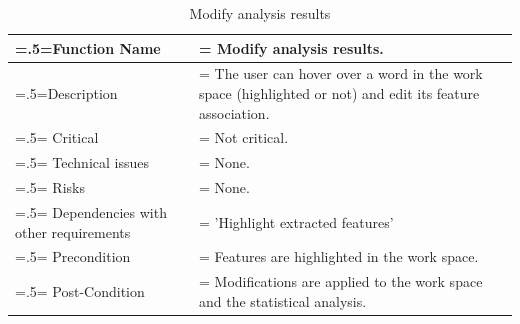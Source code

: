 \begin{center}
    \begin{table}[H]
        \caption{Modify analysis results}
        \begin{tabularx}{\textwidth} {
                | >{\raggedright\arraybackslash\hsize=.5\hsize\linewidth=\hsize}X
                | >{\raggedright\arraybackslash\hsize=1.5\hsize\linewidth=\hsize}X |}
            \hline
            Function Name                        & Modify analysis results.                                                                                \\ \hline
            Description                          & The user can hover over a word in the work space (highlighted or not) and edit its feature association. \\ \hline
            Critical                             & Not critical.                                                                                           \\ \hline
            Technical issues                     & None.                                                                                                   \\ \hline
            Risks                                & None.                                                                                                   \\ \hline
            Dependencies with other requirements & 'Highlight extracted features'                                                                          \\ \hline
            Precondition                         & Features are highlighted in the work space.                                                             \\ \hline
            Post-Condition                       & Modifications are applied to the work space and the statistical analysis.                               \\ \hline
        \end{tabularx}
    \end{table}
\end{center}

